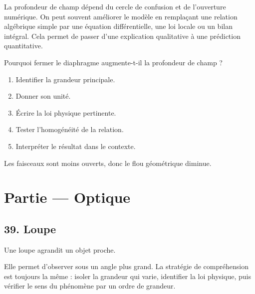 \documentclass[11pt,a4paper]{article}
\begin{document}
\begin{approfondissementbox}
La profondeur de champ dépend du cercle de confusion et de l'ouverture numérique.
On peut souvent améliorer le modèle en remplaçant une relation algébrique simple par une équation différentielle, une loi locale ou un bilan intégral. Cela permet de passer d'une explication qualitative à une prédiction quantitative.
\end{approfondissementbox}

\begin{exercicebox}
Pourquoi fermer le diaphragme augmente-t-il la profondeur de champ ?
\begin{enumerate}
  \item Identifier la grandeur principale.
  \item Donner son unité.
  \item Écrire la loi physique pertinente.
  \item Tester l'homogénéité de la relation.
  \item Interpréter le résultat dans le contexte.
\end{enumerate}
\end{exercicebox}

\begin{corrigebox}[Indication]
Les faisceaux sont moins ouverts, donc le flou géométrique diminue.
\end{corrigebox}


\section{Partie — Optique}


\subsection{39. Loupe}

\begin{exemplebox}
Une loupe agrandit un objet proche.
\end{exemplebox}

\begin{methodebox}
Elle permet d'observer sous un angle plus grand.
La stratégie de compréhension est toujours la même : isoler la grandeur qui varie, identifier la loi physique, puis vérifier le sens du phénomène par un ordre de grandeur.
\end{methodebox}
\end{document}
